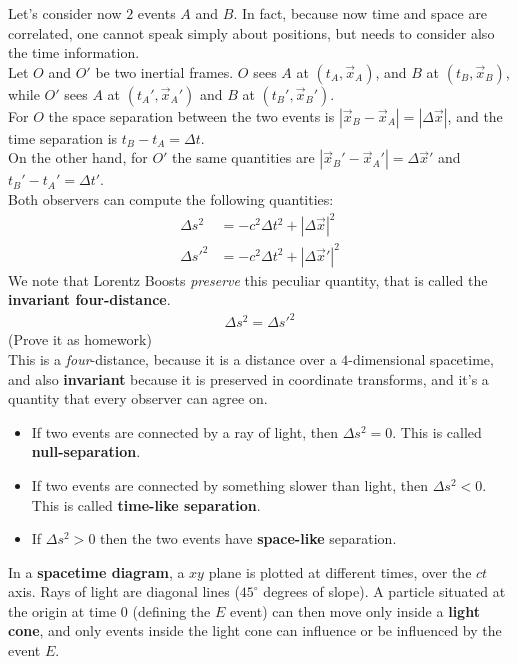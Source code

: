 \documentclass[../template.tex]{subfiles}
\begin{document}
Let's consider now $2$ events $A$ and $B$. In fact, because now time and space are correlated, one cannot speak simply about positions, but needs to consider also the time information.\\
Let $O$ and $O'$ be two inertial frames. $O$ sees $A$ at $(t_A, \vec{x}_A)$, and $B$ at $(t_B, \vec{x}_B)$, while $O'$ sees $A$ at $(t_A', \vec{x}_A')$ and $B$ at $(t_B', \vec{x}_B')$.\\

For $O$ the space separation between the two events is $|\vec{x}_B - \vec{x}_A| = |\Delta \vec{x}|$, and the time separation is $t_B-t_A =\Delta t$.\\
On the other hand, for $O'$ the same quantities are $|\vec{x}_B'-\vec{x}_A'|=\Delta\vec{x}'$ and $t_B'-t_A'=\Delta t'$.\\

Both observers can compute the following quantities:
\begin{align*}
\Delta s^2 &= -c^2 \Delta t^2 + |\Delta \vec{x}|^2\\
\Delta {s'}^2 &= -c^2\Delta t^2 + |\Delta \vec{x}'|^2
\end{align*}
We note that Lorentz Boosts \textit{preserve} this peculiar quantity, that is called the \textbf{invariant four-distance}.
\begin{align*}
\Delta s^2 = \Delta {s'}^2
\end{align*}
(Prove it as homework)\\
This is a \textit{four}-distance, because it is a distance over a $4$-dimensional spacetime, and also \textbf{invariant} because it is preserved in coordinate transforms, and it's a quantity that every observer can agree on.

\begin{itemize}
\item If two events are connected by a ray of light, then $\Delta s^2 = 0$. This is called \textbf{null-separation}.
\item If two events are connected by something slower than light, then $\Delta s^2 < 0$. This is called \textbf{time-like separation}.
\item If $\Delta s^2 > 0$ then the two events have \textbf{space-like} separation.
\end{itemize}

In a \textbf{spacetime diagram}, a $xy$ plane is plotted at different times, over the $ct$ axis. Rays of light are diagonal lines ($45^\circ$ degrees of slope). A particle situated at the origin at time $0$ (defining the $E$ event) can then move only inside a \textbf{light cone}, and only events inside the light cone can influence or be influenced by the event $E$.
\end{document}
